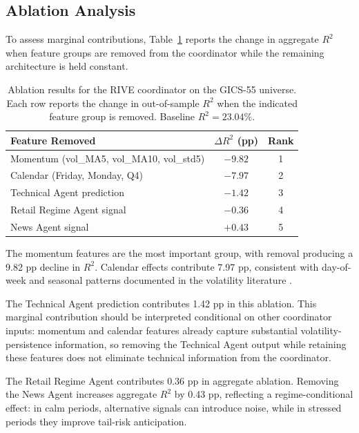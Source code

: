 \documentclass[review]{elsarticle}
\begin{document}
\subsection{Ablation Analysis}\label{sec:ablation}

To assess marginal contributions, Table~\ref{tab:ablation} reports the change in aggregate $R^2$ when feature groups are removed from the coordinator while the remaining architecture is held constant.

\begin{table}[H]
\centering
\caption{Ablation results for the RIVE coordinator on the GICS-55 universe. Each row reports the change in out-of-sample $R^2$ when the indicated feature group is removed. Baseline $R^2 = 23.04\%$.}
\label{tab:ablation}
\begin{tabular}{lcc}
\toprule
Feature Removed & $\Delta R^2$ (pp) & Rank \\
\midrule
Momentum (vol\_MA5, vol\_MA10, vol\_std5) & $-9.82$ & 1 \\
Calendar (Friday, Monday, Q4) & $-7.97$ & 2 \\
Technical Agent prediction & $-1.42$ & 3 \\
Retail Regime Agent signal & $-0.36$ & 4 \\
News Agent signal & $+0.43$ & 5 \\
\bottomrule
\end{tabular}
\end{table}

The momentum features are the most important group, with removal producing a 9.82 pp decline in $R^2$. Calendar effects contribute 7.97 pp, consistent with day-of-week and seasonal patterns documented in the volatility literature \cite{french1986,bollerslevhodrick1999}.

The Technical Agent prediction contributes 1.42 pp in this ablation. This marginal contribution should be interpreted conditional on other coordinator inputs: momentum and calendar features already capture substantial volatility-persistence information, so removing the Technical Agent output while retaining these features does not eliminate technical information from the coordinator.

The Retail Regime Agent contributes 0.36 pp in aggregate ablation. Removing the News Agent increases aggregate $R^2$ by 0.43 pp, reflecting a regime-conditional effect: in calm periods, alternative signals can introduce noise, while in stressed periods they improve tail-risk anticipation.
\end{document}
